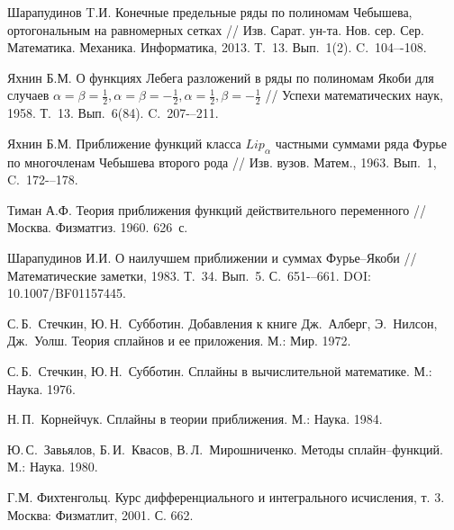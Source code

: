 \begin{thebibliography}{999}
 Шарапудинов T.И.
Конечные предельные ряды по полиномам Чебышева, ортогональным на равномерных сетках
// Изв. Сарат. ун-та. Нов. сер. Сер. Математика. Механика. Информатика, 2013. Т.~13. Вып.~1(2). C.~104–-108.





 Яхнин Б.М. О функциях Лебега разложений в ряды по полиномам Якоби для случаев $\alpha=\beta=\frac12, \alpha=\beta=-\frac12, \alpha=\frac12, \beta=-\frac12$ // Успехи математических наук, 1958. Т.~13. Вып.~6(84). C.~207-–211.




 Яхнин Б.М. Приближение функций класса $Lip_\alpha$ частными суммами ряда Фурье по многочленам Чебышева второго рода // Изв. вузов. Матем., 1963. Вып.~1, C.~172-–178.




 Тиман А.Ф. Теория приближения функций действительного переменного // Москва. Физматгиз. 1960. 626~с.




 Шарапудинов И.И. О наилучшем приближении и суммах Фурье–Якоби // Математические заметки, 1983. Т.~34. Вып.~5. С.~651-–661. DOI: 10.1007/BF01157445.




  С.\,Б.~Стечкин, Ю.\,Н.~Субботин. Добавления к книге Дж.~Алберг, Э.~Нилсон, Дж.~Уолш.
 Теория сплайнов и ее приложения.  М.: Мир. 1972.




 С.\,Б.~Стечкин, Ю.\,Н.~Субботин.  Сплайны в вычислительной математике. М.:  Наука. 1976.




  Н.\,П.~Корнейчук.  Сплайны в теории приближения. М.:  Наука. 1984.





 Ю.\,С.~Завьялов, Б.\,И.~Квасов, В.\,Л.~Мирошниченко.  Методы сплайн--функций.  М.: Наука. 1980.





Г.М. Фихтенгольц. Курс дифференциального и интегрального исчисления, т. 3. Москва: Физматлит, 2001. С. 662.

\end{thebibliography}
